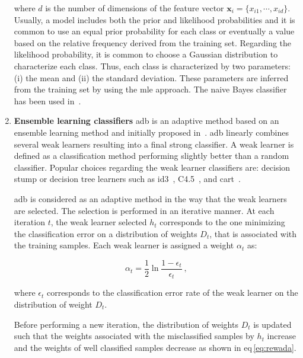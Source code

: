 \begin{enumerate}[leftmargin=*]
  \noindent where $d$ is the number of dimensions of the feature vector
  $\mathbf{x}_i = \{x_{i1},\cdots,x_{id}\}$.
  Usually, a model includes both the prior and likelihood probabilities and it
  is common to use an equal prior probability for each class or eventually a
  value based on the relative frequency derived from the training set.
  Regarding the likelihood probability, it is common to choose a Gaussian
  distribution to characterize each class.
  Thus, each class is characterized by two parameters: (i) the mean and (ii)
  the standard deviation.
  These parameters are inferred from the training set by using the \ac{mle}
  approach.
  The naive Bayes classifier has been used
  in~\cite{Giannini2013,Mazzetti2011,Niaf2011,Niaf2012,Niaf2012,cameron2014multiparametric,cameron2016maps,rampun2015classifying,rampun2016computerb,rampun2015computer,rampun2016computer}.

\item[] \textbf{Ensemble learning classifiers}
  \Ac{adb} is an adaptive method based on an ensemble learning method and
  initially proposed in~\cite{Freund1997}.
  \Ac{adb} linearly combines several weak learners resulting into a final
  strong classifier.
  A weak learner is defined as a classification method performing slightly
  better than a random classifier.
  Popular choices regarding the weak learner classifiers are: decision stump or
  decision tree learners such as \ac{id3}~\cite{Quinlan1986},
  C4.5~\cite{Quinlan1993}, and \ac{cart}~\cite{Breiman1984}.

  \Ac{adb} is considered as an adaptive method in the way that the weak
  learners are selected.
  The selection is performed in an iterative manner.
  At each iteration $t$, the weak learner selected $h_t$ corresponds to the one
  minimizing the classification error on a distribution of weights $D_t$, that
  is associated with the training samples.
  Each weak learner is assigned a weight $\alpha_t$ as:

  \begin{equation}
    \alpha_t = \frac{1}{2} \ln \frac{1 - \epsilon_t}{\epsilon_t} \ ,
    \label{eq:wclssada}
  \end{equation}

  \noindent where $\epsilon_t$ corresponds to the classification error rate of
  the weak learner on the distribution of weight $D_t$.

  Before performing a new iteration, the distribution of weights $D_t$ is
  updated such that the weights associated with the misclassified samples by
  $h_t$ increase and the weights of well classified samples decrease as shown
  in \acs{eq}\,\eqref{eq:rewada}.


\end{enumerate}

